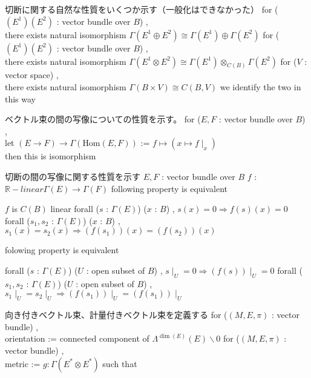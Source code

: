 \begin{Theorem}
\itemnote
  切断に関する自然な性質をいくつか示す（一般化はできなかった）
\itemprop
  for (\((E^1) (E^2)\) : vector bundle over \(B\)) ,\\
  there exists natural isomorphism \(\Gamma(E^1 \oplus E^2) \cong \Gamma(E^1) \oplus \Gamma(E^2)\)
\itemprop
  for (\((E^1) (E^2)\) : vector bundle over \(B\)) ,\\
  there exists natural isomorphism \(\Gamma(E^1 \otimes E^2) \cong \Gamma(E^1) \otimes_{C(B)} \Gamma(E^2)\)
\itemprop
  for (\(V\) : vector space) ,\\
  there exists natural isomorphism \(\Gamma(B \times V) \cong C(B , V)\)
\itemdefi
  we identify the two in this way
\end{Theorem}

\begin{Theorem}
\itemnote
  ベクトル束の間の写像についての性質を示す。
\itemdefi
  for (\(E , F\) : vector bundle over \(B\)) ,\\
  let \((E \to F) \to \Gamma(\text{Hom}(E , F))\) := \(f \mapsto (x \mapsto f \mid_{x})\) \\
  then this is isomorphism
\end{Theorem}

\begin{Definition}
\itemnote
  切断の間の写像に関する性質を示す
\itemwhen \(E , F\) : vector bundle over \(B\)
\itemwhen \(f\) : \(\mathbb{R}-linear \Gamma(E) \to \Gamma(F)\)
\itemprop
  following property is equivalent
  \begin{itemize}
    \itemenum \(f\) is \(C(B)\) linear
    \itemenum forall (\(s\) : \(\Gamma(E)\)) (\(x\) : \(B\)) , \(s(x) = 0 \Rightarrow f(s)(x) = 0\)
    \itemenum forall (\(s_1 , s_2\) : \(\Gamma(E)\)) (\(x\) : \(B\))  , \(s_1(x) = s_2(x) \Rightarrow (f(s_1))(x) = (f(s_2))(x)\) 
  \end{itemize}
\itemprop
  folowing property is equivalent 
  \begin{itemize}
    \itemenum forall (\(s\) : \(\Gamma(E)\)) (\(U\) : open subset of \(B\)) , \(s \mid_{U} = 0 \Rightarrow (f(s)) \mid_{U} = 0\)
    \itemenum forall (\(s_1 , s_2\) : \(\Gamma(E)\)) (\(U\) : open subset of \(B\)) , \(s_1 \mid_{U} = s_2 \mid_{U} \Rightarrow (f(s_1)) \mid_{U} = (f(s_1)) \mid_{U}\)
  \end{itemize}
\end{Definition}

\begin{Definition}
\itemnote 向き付きベクトル束、計量付きベクトル束を定義する
\itemdefi
  for (\((M , E , \pi)\) : vector bundle) ,\\
  orientation := connected component of \(\Lambda^{\dim(E)}(E) \backslash 0\)
\itemdefi
  for (\((M , E , \pi)\) : vector bundle) ,\\
  metric := \(g : \Gamma(E^* \otimes E^*)\) such that  
\end{Definition}

